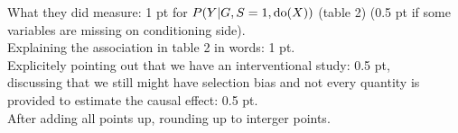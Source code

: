 \begin{enumerate}[resume*]
{What they did measure: 1 pt for $P(Y|G,S=1,\operatorname{do}(X))$ (table 2) (0.5 pt if some variables are missing on conditioning side).\\
Explaining the association in table 2 in words: 1 pt.\\
Explicitely pointing out that we have an interventional study: 0.5 pt,\\
discussing that we still might have selection bias and not every quantity is provided to estimate the causal effect: 0.5 pt.\\
After adding all points up, rounding up to interger points.
}
\end{enumerate}
